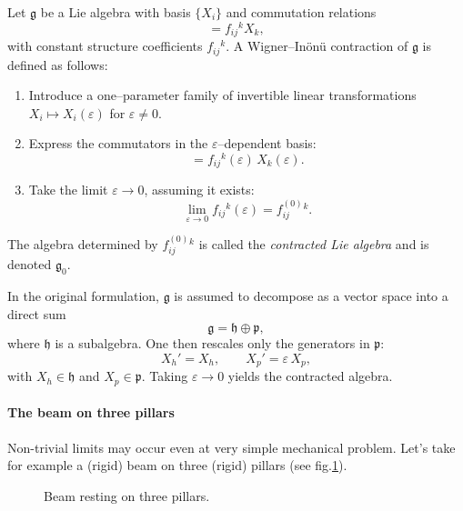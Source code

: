Let $\mathfrak{g}$ be a Lie algebra with basis $\{X_i\}$ and commutation
relations
\begin{equation}
   [X_i,X_j] = f_{ij}{}^{k} X_k ,
\end{equation}
with constant structure coefficients $f_{ij}{}^{k}$.  A
Wigner--In\"on\"u contraction of $\mathfrak{g}$ is defined as follows:
\begin{enumerate}
\item Introduce a one--parameter family of invertible linear transformations
      $X_i \mapsto X_i(\varepsilon)$ for $\varepsilon \neq 0$.
\item Express the commutators in the $\varepsilon$--dependent basis:
\begin{equation}
    [X_i(\varepsilon),X_j(\varepsilon)]
        = f_{ij}{}^{k}(\varepsilon) \, X_k(\varepsilon).
\end{equation}
\item Take the limit $\varepsilon \to 0$, assuming it exists:
\begin{equation}
    \lim_{\varepsilon\to 0} f_{ij}{}^{k}(\varepsilon)
        = f^{(0)}_{ij}{}^{k}.
\end{equation}
\end{enumerate}
The algebra determined by $f^{(0)}_{ij}{}^{k}$ is called the
\emph{contracted Lie algebra} and is denoted $\mathfrak{g}_0$.

In the original formulation, $\mathfrak{g}$ is assumed to decompose as a vector
space into a direct sum
\begin{equation}
    \mathfrak{g} = \mathfrak{h} \oplus \mathfrak{p},
\end{equation}
where $\mathfrak{h}$ is a subalgebra.  One then rescales only the generators in
$\mathfrak{p}$:
\begin{equation}
   X_h' = X_h, \qquad
   X_p' = \varepsilon\, X_p,
\end{equation}
with $X_h \in \mathfrak{h}$ and $X_p \in \mathfrak{p}$.
Taking $\varepsilon \to 0$ yields the contracted algebra.

\paragraph{ The beam on three pillars}
Non-trivial limits may occur even at very simple mechanical
 problem. Let's take for example
a (rigid) beam on three (rigid) pillars (see fig.\ref{beam3}).

\begin{figure}[htbp]
    \centering
    \caption{Beam resting on three pillars.}
    \label{beam3}
\end{figure}

